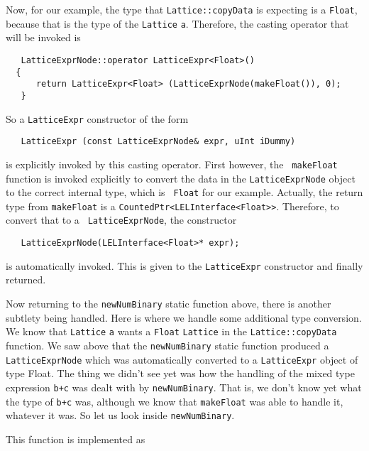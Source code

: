 Now, for our example, the type that {\tt Lattice::copyData} is expecting is
a {\tt Float}, because that is the type of the {\tt Lattice} {\tt a}.  Therefore,
the casting operator that will be invoked is

\begin{verbatim}
   LatticeExprNode::operator LatticeExpr<Float>()
  {
      return LatticeExpr<Float> (LatticeExprNode(makeFloat()), 0);
   }
\end{verbatim}

So a {\tt LatticeExpr} constructor of the form

\begin{verbatim}
   LatticeExpr (const LatticeExprNode& expr, uInt iDummy)
\end{verbatim}

is explicitly invoked by this casting operator.  First however, the {\tt
makeFloat} function is invoked explicitly to convert the data in the
{\tt LatticeExprNode} object to the correct internal type, which is {\tt
Float} for our example.  Actually, the return type from {\tt makeFloat} is a
{\tt CountedPtr<LELInterface<Float>>}.  Therefore, to convert that to a {\tt
LatticeExprNode}, the constructor

\begin{verbatim}
   LatticeExprNode(LELInterface<Float>* expr);
\end{verbatim}

is automatically invoked.  This is given to the {\tt LatticeExpr} constructor
and finally returned. 

Now returning to the {\tt newNumBinary} static function above, there is
another subtlety being handled.  Here is where we handle some additional
type conversion.  We know that {\tt Lattice} {\tt a} wants a {\tt Float}
{\tt Lattice} in the {\tt Lattice::copyData} function.  We saw above that the
{\tt newNumBinary} static function produced a {\tt LatticeExprNode} which was
automatically converted to a {\tt LatticeExpr} object of type Float. 
The thing we didn't see yet was how the handling of the mixed type
expression {\tt b+c} was dealt with by {\tt newNumBinary}. That is, we don't know
yet what the type of {\tt b+c} was, although we know that {\tt makeFloat} was able
to handle it, whatever it was.  So let us look inside {\tt newNumBinary}.

This function is implemented as

